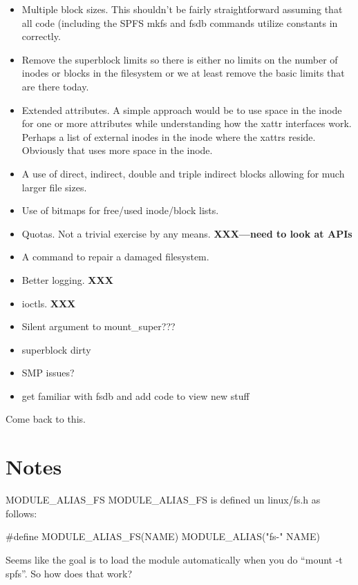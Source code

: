 \begin{itemize}
	\item Multiple block sizes. This shouldn't be fairly straightforward assuming that all code (including the
		SPFS mkfs and fsdb commands utilize constants in  correctly.
	\item Remove the superblock limits so there is either no limits on the number of inodes or blocks in
		the filesystem or we at least remove the basic limits that are there today.
	\item Extended attributes. A simple approach would be to use space in the inode for one or more
		attributes while understanding how the xattr interfaces work. Perhaps a list of external inodes in the 
		inode where the xattrs reside. Obviously that uses more space in the inode.
	\item A use of direct, indirect, double and triple indirect blocks allowing for much larger file sizes.
	\item Use of bitmaps for free/used inode/block lists.
	\item Quotas. Not a trivial exercise by any means. \textbf{XXX---need to look at APIs}
	\item A  command to repair a damaged filesystem.
	\item Better logging. \textbf{XXX}
	\item ioctls. \textbf{XXX}
	\item Silent argument to mount\_super???
	\item superblock dirty
	\item SMP issues?
	\item get familiar with fsdb and add code to view new stuff
\end{itemize}

\noindent
Come back to this.


\section{Notes}

MODULE\_ALIAS\_FS
MODULE\_ALIAS\_FS is defined un linux/fs.h as follows:

\#define MODULE\_ALIAS\_FS(NAME) MODULE\_ALIAS("fs-" NAME)

Seems like the goal is to load the module automatically when you do “mount -t spfs”. So how does that work?


